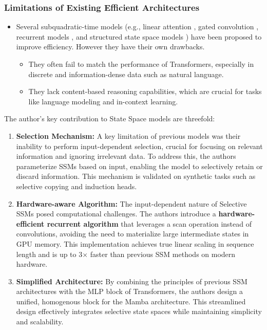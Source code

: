 \documentclass[12pt, conference, compsoc, onecolumn]{IEEEtran}
\begin{document}
	\subsubsection*{Limitations of Existing Efficient Architectures}
	\begin{itemize}
		\item Several subquadratic-time models (e.g., linear attention \cite{katharopoulos2020transformersrnnsfastautoregressive}, gated convolution \cite{rao2022hornetefficienthighorderspatial}, recurrent models \cite{bulatov2022recurrentmemorytransformer}, and structured state space models \cite{gu2022efficientlymodelinglongsequences}) have been proposed to improve efficiency. However they have their own drawbacks. 
		\begin{itemize}
			\item They often fail to match the performance of Transformers, especially in discrete and information-dense data such as natural language.
			\item They lack content-based reasoning capabilities, which are crucial for tasks like language modeling and in-context learning.
			
		\end{itemize}
		
	\end{itemize}
	
	The author's key contribution to State Space models are threefold:
	\begin{enumerate}
		\item \textbf{Selection Mechanism:} A key limitation of previous models was their inability to perform input-dependent selection, crucial for focusing on relevant information and ignoring irrelevant data. To address this, the authors parameterize SSMs based on input, enabling the model to selectively retain or discard information. This mechanism is validated on synthetic tasks such as selective copying and induction heads.
		
		\item \textbf{Hardware-aware Algorithm:} The input-dependent nature of Selective SSMs posed computational challenges. The authors introduce a \textbf{hardware-efficient recurrent algorithm} that leverages a scan operation instead of convolutions, avoiding the need to materialize large intermediate states in GPU memory. This implementation achieves true linear scaling in sequence length and is up to 3× faster than previous SSM methods on modern hardware.
		
		\item \textbf{Simplified Architecture:} By combining the principles of previous SSM architectures with the MLP block of Transformers, the authors design a unified, homogenous block for the Mamba architecture. This streamlined design effectively integrates selective state spaces while maintaining simplicity and scalability.
	\end{enumerate}
	
\end{document}
